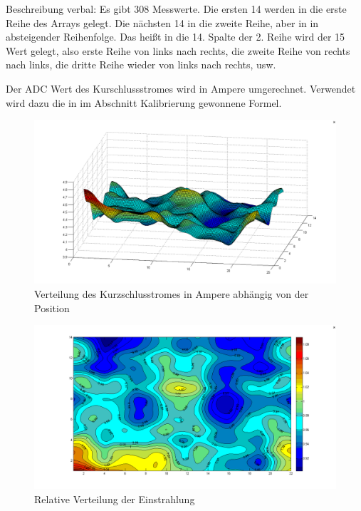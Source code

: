 \documentclass[a4paper,bibtotoc,oneside]{scrbook}
\begin{document}
Beschreibung verbal: Es gibt 308 Messwerte. Die ersten 14 werden in die erste Reihe des Arrays gelegt. Die nächsten 14 in die zweite Reihe, aber in in absteigender Reihenfolge. Das heißt in die 14. Spalte der 2. Reihe wird der 15 Wert gelegt, also erste Reihe von links nach rechts, die zweite Reihe von rechts nach links, die dritte Reihe wieder von links nach rechts, usw.







Der ADC Wert des Kurschlussstromes wird in Ampere umgerechnet. Verwendet wird dazu die in im Abschnitt Kalibrierung gewonnene Formel.

\begin{figure}[htbp]
\centering
\includegraphics[width=150mm]{img/hugel.png}
\caption[Kurzschlusstromes in Ampere]{Verteilung des Kurzschlusstromes in Ampere abhängig von der Position}\label{hugel}
\end{figure}



\begin{figure}[htbp]
\centering
\includegraphics[width=150mm]{img/karte1.png}
\caption[Relative Verteilung der Einstrahlung]{Relative Verteilung der Einstrahlung}\label{karte1}
\end{figure}
\end{document}
